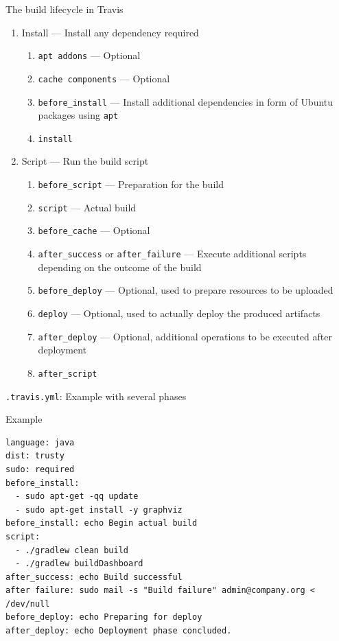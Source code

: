 \documentclass[presentation]{beamer}
\begin{document}
\begin{frame}[fragile]{The build lifecycle in Travis}
    \begin{enumerate}
        \item Install --- Install any dependency required
        \begin{enumerate}
            \item \texttt{apt addons} --- Optional
            \item \texttt{cache components} --- Optional
            \item \texttt{before\_install} --- Install additional dependencies in form of Ubuntu packages using \texttt{apt}
            \item \texttt{install}
        \end{enumerate}
        \item Script --- Run the build script
        \begin{enumerate}
            \item \texttt{before\_script} --- Preparation for the build
            \item \texttt{script} --- Actual build
            \item \texttt{before\_cache} --- Optional
            \item \texttt{after\_success} or \texttt{after\_failure} --- Execute additional scripts depending on the outcome of the build
            \item \texttt{before\_deploy} --- Optional, used to prepare resources to be uploaded
            \item \texttt{deploy} --- Optional, used to actually deploy the produced artifacts
            \item \texttt{after\_deploy} --- Optional, additional operations to be executed after deployment
            \item \texttt{after\_script}
        \end{enumerate}
    \end{enumerate}
\end{frame}

\begin{frame}[fragile]{\texttt{.travis.yml}: Example with several phases}
    \begin{block}{Example}
        \begin{verbatim}
language: java
dist: trusty
sudo: required
before_install:
  - sudo apt-get -qq update
  - sudo apt-get install -y graphviz
before_install: echo Begin actual build
script:
  - ./gradlew clean build
  - ./gradlew buildDashboard
after_success: echo Build successful
after failure: sudo mail -s "Build failure" admin@company.org < /dev/null
before_deploy: echo Preparing for deploy
after_deploy: echo Deployment phase concluded.
        \end{verbatim}
    \end{block}
\end{frame}
\end{document}
